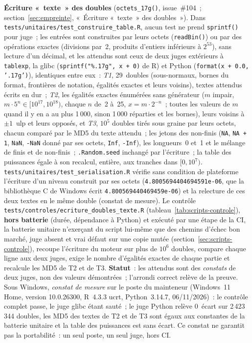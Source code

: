 \documentclass[a4paper,11pt]{article}
\newcommand{\code}[1]{\texttt{\small #1}}
\begin{document}
\medskip
\textbf{Écriture «~texte~» des doubles} (\code{octets\_17g()}, issue~\#104~;
section~\ref{sec:empreinte}, «~Écriture «~texte~» des doubles~»). Dans
\code{tests/unitaires/test\_construire\_table.R}, aucun test ne prend
\code{sprintf()} pour juge~; les entrées sont construites par leurs octets
(\code{readBin()}) ou par des opérations exactes (divisions par~2, produits
d'entiers inférieurs à $2^{53}$), sans lecture d'un décimal, et les attendus
sont ceux de deux juges extérieurs à \code{tablexp}, la glibc
(\code{sprintf("\%.17g", x + 0)} de R) et Python (\code{format(x + 0.0,
'.17g')}), identiques entre eux~: \emph{T1}, 29~doubles (sous-normaux,
bornes du format, frontières de notation, égalités exactes et leurs
voisins), textes attendus écrits en dur~; \emph{T2}, les égalités exactes
énumérées sans générateur ($m$ impair, $m \cdot 5^{n} \in [10^{17},
10^{18})$, chaque $n$ de~2 à~25, $x = m \cdot 2^{-n}$~; toutes les valeurs
de $m$ quand il y en a au plus 1\,000, sinon 1\,000 réparties et les
bornes), leurs voisins à $\pm 1$~ulp
et leurs opposés, et \emph{T3}, $10^{5}$ doubles tirés sous graine par leurs
octets, chacun comparé par le MD5 du texte attendu~; les jetons des
non-finis (\code{NA}, \code{NA + 1}, \code{NaN}, \code{-NaN} donné par ses
octets, \code{Inf}, \code{-Inf}), les longueurs~0 et~1 et le mélange de
finis et de non-finis~; \code{.Random.seed} inchangé par l'écriture~; la
table des puissances égale à son recalcul, entière, aux tranches dans
$[0, 10^{7})$. \code{tests/unitaires/test\_serialisation.R} vérifie sans
condition de plateforme l'écriture d'un niveau construit par ses octets
(\code{4.8005694404694591e-06}, que la bibliothèque C de Windows écrit
\code{4.800569440469459e-06}) et la relecture de ces deux textes en le même
double (constat de mesure). Le contrôle
\code{tests/controles/ecriture\_doubles\_texte.R}
(tableau~\ref{tab:scripts-controle}), \textbf{hors batterie} (durée,
dépendance à Python) et exécuté par une étape de la CI, la batterie
unitaire n'exerçant du script lui-même que des chemins d'échec bon marché,
juge absent et vrai défaut sur une copie mutée (section~\ref{sec:scripts-controle}),
recoupe l'écriture
du moteur sur plus de $10^{6}$ doubles, compare chaque ligne aux deux
juges, exige le nombre d'égalités exactes de chaque partie et recalcule les
MD5 de T2 et de T3. \textbf{Statut}~: les attendus sont des \emph{constats}
de deux juges, non des valeurs démontrées~; l'arrondi correct relève de
la preuve. Sous Windows, \emph{constat de mesure} sur le poste du
mainteneur (Windows~11 Home, version 10.0.26300, R~4.3.3 ucrt,
Python~3.14.7, 06/11/2026)~: le contrôle complet passe, le juge glibc étant
sauté~; le juge Python relève 0~écart sur 2\,423\,344 doubles, les MD5 des
textes de T2 et de T3 sont égaux aux constantes de la batterie unitaire et
la table des puissances est sans écart. Ce constat ne garantit pas la
portabilité~: un seul poste, un seul juge, hors CI.
\end{document}
